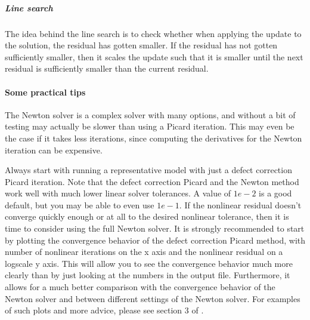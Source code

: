 \subparagraph{Line search}
The idea behind the line search is to check whether when applying the update to the 
solution, the residual has gotten smaller. If the residual has not gotten sufficiently 
smaller, then it scales the update such that it is smaller until the next residual is 
sufficiently smaller than the current residual.

\paragraph{Some practical tips}
The Newton solver is a complex solver with many options, and without a bit of testing may 
actually be slower than using a Picard iteration. This may even be the case if it takes 
less iterations, since computing the derivatives for the Newton iteration can be expensive.

Always start with running a representative model with just a defect correction Picard iteration.
Note that the defect correction Picard and the Newton method work well with much lower 
linear solver tolerances. A value of $1e-2$ is a good default, but you may be able to 
even use $1e-1$. 
If the nonlinear residual doesn't converge quickly enough or at all to the desired nonlinear 
tolerance, then it is time to consider using the full Newton solver. It is strongly 
recommended to start by plotting the convergence behavior of the defect correction Picard 
method, with number of nonlinear iterations on the x axis and the nonlinear residual on a 
logscale y axis. This will allow you to see the convergence behavior much more clearly 
than by just looking at the numbers in the \aspect{} output file. Furthermore, it allows 
for a much better comparison with the convergence behavior of the Newton solver and 
between different settings of the Newton solver. For examples of such plots and more advice, 
please see section 3 of \cite{FBTGS19}.